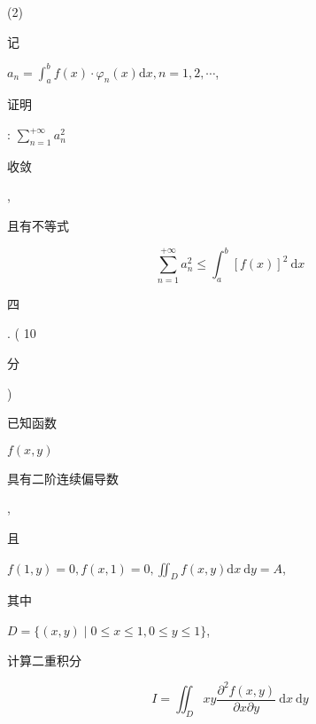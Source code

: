 \documentclass[10pt]{article}
\begin{document}
(2) \begin{CJK}{UTF8}{mj}记\end{CJK} $a_{n}=\int_{a}^{b} f(x) \cdot \varphi_{n}(x) \mathrm{d} x, n=1,2, \cdots$, \begin{CJK}{UTF8}{mj}证明\end{CJK}: $\sum_{n=1}^{+\infty} a_{n}^{2}$ \begin{CJK}{UTF8}{mj}收敛\end{CJK}, \begin{CJK}{UTF8}{mj}且有不等式\end{CJK}
$$
\sum_{n=1}^{+\infty} a_{n}^{2} \leqslant \int_{a}^{b}[f(x)]^{2} \mathrm{~d} x
$$
\begin{CJK}{UTF8}{mj}四\end{CJK}. ( 10 \begin{CJK}{UTF8}{mj}分\end{CJK}) \begin{CJK}{UTF8}{mj}已知函数\end{CJK} $f(x, y)$ \begin{CJK}{UTF8}{mj}具有二阶连续偏导数\end{CJK}, \begin{CJK}{UTF8}{mj}且\end{CJK} $f(1, y)=0, f(x, 1)=0, \iint_{D} f(x, y) \mathrm{d} x \mathrm{~d} y=A$, \begin{CJK}{UTF8}{mj}其中\end{CJK} $D=\{(x, y) \mid 0 \leqslant x \leqslant 1,0 \leqslant y \leqslant 1\}$, \begin{CJK}{UTF8}{mj}计算二重积分\end{CJK}
$$
I=\iint_{D} x y \frac{\partial^{2} f(x, y)}{\partial x \partial y} \mathrm{~d} x \mathrm{~d} y
$$
\end{document}
